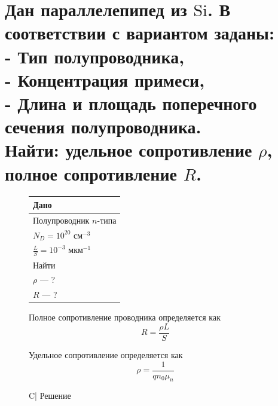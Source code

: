 \documentclass[12pt,a4paper]{article}
\theoremstyle{plain}
\theoremstyle{definition}
\theoremstyle{remark}
\numberwithin{equation}{section}
\begin{document}
\section{\large\textnormal{Дан параллелепипед из $\text{Si}$. В соответствии 
с вариантом заданы: \\
- Тип полупроводника, \\
- Концентрация примеси, \\
- Длина и площадь поперечного сечения полупроводника. \\
Найти: удельное сопротивление $\rho$, полное сопротивление $R$.}}

\begin{figure}[H]
    \begin{minipage}[t]{0.3\textwidth}
        \vspace{0em}
        \begin{tabularx}{\textwidth}{|X|}
            \hline
            \multicolumn{1}{|C|}{Дано} \\
            \hline
            Полупроводник $n$-типа \\
            $N_D = 10^{20}$ см$^{-3}$ \\
            $\frac{L}{S} = 10^{-3}$ мкм$^{-1}$ \\
            \hline
            \multicolumn{1}{|C|}{Найти} \\
            \hline
            $\rho$ — ? \\
            $R$ — ? \\
            \hline
        \end{tabularx}


        \vspace{0.5em}
        Полное сопротивление проводника определяется как
        \begin{equation*}
            R = \frac{\rho L}{S}
        \end{equation*}

        Удельное сопротивление определяется как
        \begin{equation*}
            \rho = \frac{1}{q n_0 \mu_n}
        \end{equation*}
        
    \end{minipage}\hfill
    \begin{minipage}[t]{0.7\textwidth}
        \vspace{0em}
        \begin{tabularx}{\textwidth}{C|}
            \hline
            Решение \\
            \hline            
        \end{tabularx}


\end{minipage}
\end{figure}
\end{document}
